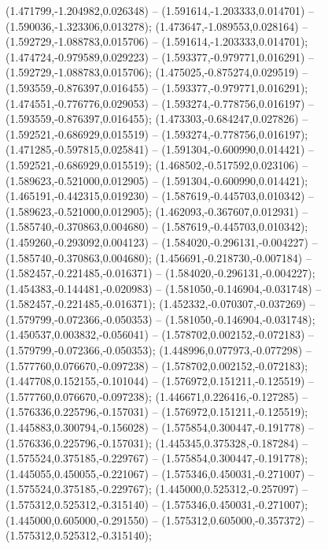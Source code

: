  (1.471799,-1.204982,0.026348) -- (1.591614,-1.203333,0.014701) -- (1.590036,-1.323306,0.013278);
 (1.473647,-1.089553,0.028164) -- (1.592729,-1.088783,0.015706) -- (1.591614,-1.203333,0.014701);
 (1.474724,-0.979589,0.029223) -- (1.593377,-0.979771,0.016291) -- (1.592729,-1.088783,0.015706);
 (1.475025,-0.875274,0.029519) -- (1.593559,-0.876397,0.016455) -- (1.593377,-0.979771,0.016291);
 (1.474551,-0.776776,0.029053) -- (1.593274,-0.778756,0.016197) -- (1.593559,-0.876397,0.016455);
 (1.473303,-0.684247,0.027826) -- (1.592521,-0.686929,0.015519) -- (1.593274,-0.778756,0.016197);
 (1.471285,-0.597815,0.025841) -- (1.591304,-0.600990,0.014421) -- (1.592521,-0.686929,0.015519);
 (1.468502,-0.517592,0.023106) -- (1.589623,-0.521000,0.012905) -- (1.591304,-0.600990,0.014421);
 (1.465191,-0.442315,0.019230) -- (1.587619,-0.445703,0.010342) -- (1.589623,-0.521000,0.012905);
 (1.462093,-0.367607,0.012931) -- (1.585740,-0.370863,0.004680) -- (1.587619,-0.445703,0.010342);
 (1.459260,-0.293092,0.004123) -- (1.584020,-0.296131,-0.004227) -- (1.585740,-0.370863,0.004680);
 (1.456691,-0.218730,-0.007184) -- (1.582457,-0.221485,-0.016371) -- (1.584020,-0.296131,-0.004227);
 (1.454383,-0.144481,-0.020983) -- (1.581050,-0.146904,-0.031748) -- (1.582457,-0.221485,-0.016371);
 (1.452332,-0.070307,-0.037269) -- (1.579799,-0.072366,-0.050353) -- (1.581050,-0.146904,-0.031748);
 (1.450537,0.003832,-0.056041) -- (1.578702,0.002152,-0.072183) -- (1.579799,-0.072366,-0.050353);
 (1.448996,0.077973,-0.077298) -- (1.577760,0.076670,-0.097238) -- (1.578702,0.002152,-0.072183);
 (1.447708,0.152155,-0.101044) -- (1.576972,0.151211,-0.125519) -- (1.577760,0.076670,-0.097238);
 (1.446671,0.226416,-0.127285) -- (1.576336,0.225796,-0.157031) -- (1.576972,0.151211,-0.125519);
 (1.445883,0.300794,-0.156028) -- (1.575854,0.300447,-0.191778) -- (1.576336,0.225796,-0.157031);
 (1.445345,0.375328,-0.187284) -- (1.575524,0.375185,-0.229767) -- (1.575854,0.300447,-0.191778);
 (1.445055,0.450055,-0.221067) -- (1.575346,0.450031,-0.271007) -- (1.575524,0.375185,-0.229767);
 (1.445000,0.525312,-0.257097) -- (1.575312,0.525312,-0.315140) -- (1.575346,0.450031,-0.271007);
 (1.445000,0.605000,-0.291550) -- (1.575312,0.605000,-0.357372) -- (1.575312,0.525312,-0.315140);
